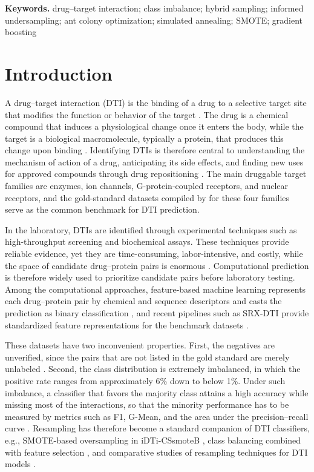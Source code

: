 \documentclass[10pt,a4paper]{article}
\begin{document}
\medskip
\noindent\textbf{Keywords.} drug--target interaction; class imbalance;
hybrid sampling; informed undersampling; ant colony optimization;
simulated annealing; SMOTE; gradient boosting


\section{Introduction}

A drug--target interaction (DTI) is the binding of a drug to a
selective target site that modifies the function or behavior of the
target \citep{azlimkhan2023comparative}. The drug is a chemical
compound that induces a physiological change once it enters the body,
while the target is a biological macromolecule, typically a protein,
that produces this change upon binding \citep{you2018drug}. Identifying
DTIs is therefore central to understanding the mechanism of action of a
drug, anticipating its side effects, and finding new uses for approved
compounds through drug repositioning \citep{bagherian2021machine,
azlimkhan2023comparative}. The main druggable target families are
enzymes, ion channels, G-protein-coupled receptors, and nuclear
receptors, and the gold-standard datasets compiled by
\citet{yamanishi2008prediction} for these four families serve as the
common benchmark for DTI prediction.

In the laboratory, DTIs are identified through experimental techniques
such as high-throughput screening and biochemical assays. These
techniques provide reliable evidence, yet they are time-consuming,
labor-intensive, and costly, while the space of candidate drug--protein
pairs is enormous \citep{you2018drug, barkat2021drug}. Computational
prediction is therefore widely used to prioritize candidate pairs before
laboratory testing. Among the computational approaches, feature-based
machine learning represents each drug--protein pair by chemical and
sequence descriptors and casts the prediction as binary classification
\citep{chen2018machine}, and recent pipelines such as SRX-DTI provide
standardized feature representations for the benchmark datasets
\citep{khojasteh2023improving}.

These datasets have two inconvenient properties. First, the negatives
are unverified, since the pairs that are not listed in the gold standard
are merely unlabeled \citep{shi2019predicting}. Second, the class
distribution is extremely imbalanced, in which the positive rate ranges
from approximately 6\% down to below 1\%. Under such imbalance, a
classifier that favors the majority class attains a high accuracy while
missing most of the interactions, so that the minority performance has
to be measured by metrics such as F1, G-Mean, and the area under the
precision--recall curve \citep{saito2015precision}. Resampling has
therefore become a standard companion of DTI classifiers, e.g.,
SMOTE-based oversampling in iDTi-CSsmoteB \citep{mahmud2019idti}, class
balancing combined with feature selection \citep{redkar2020machine},
and comparative studies of resampling techniques for DTI models
\citep{azlimkhan2023comparative}.
\end{document}
